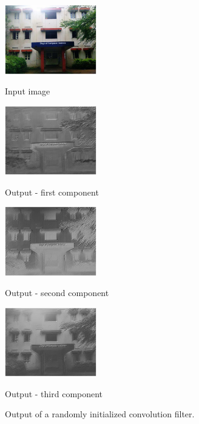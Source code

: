 \documentclass{article}
\begin{document}
\begin{figure}[t]

\begin{minipage}[b]{.48\linewidth}
  \centering
  \centerline{\includegraphics[width=4.0cm]{Figures/org}}
  \centerline{Input image}\medskip
\end{minipage}
%
\begin{minipage}[b]{.48\linewidth}
  \centering
  \centerline{\includegraphics[width=4.0cm]{Figures/first}}
  \centerline{Output - first component }\medskip
\end{minipage}
\hfill
\begin{minipage}[b]{0.48\linewidth}
  \centering
  \centerline{\includegraphics[width=4.0cm]{Figures/second}}
  \centerline{Output - second component}\medskip
\end{minipage}
%
\begin{minipage}[b]{0.48\linewidth}
  \centering
  \centerline{\includegraphics[width=4.0cm]{Figures/third}}
  \centerline{Output - third component}\medskip
\end{minipage}
%
\caption{Output of a randomly initialized convolution filter.
}
\label{fig:res}
%
\end{figure}
\end{document}
